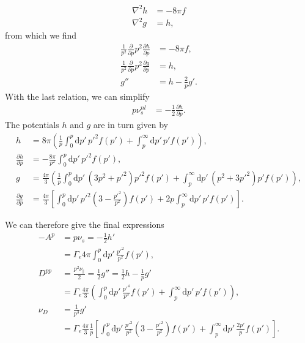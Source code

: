 \documentclass[11pt,a4paper]{article}
\newcommand{\rd}{\ensuremath{\mathrm{d}}}
\begin{document}
\begin{align}
\nabla^2 h &= -8\pi f \nonumber \\
\nabla^2 g &= h,
\end{align}
from which we find
\begin{align}
\frac{1}{p^2}\frac{\partial}{\partial p}p^2\frac{\partial h}{\partial p} &= -8\pi f, \nonumber \\
\frac{1}{p^2}\frac{\partial}{\partial p}p^2\frac{\partial g}{\partial p} &= h , \nonumber \\
g'' &= h-\frac{2}{p}g'.
\end{align}
With the last relation, we can simplify
\begin{align}
p\nu_s^{nl} &=  -\frac{1}{2}\frac{\partial h}{\partial p}. %
\end{align}
The potentials $h$ and $g$ are in turn given by
\begin{align}
h &= 8\pi \left( \frac{1}{p}\int_0^p \rd p' \, p'^2 f(p') + \int_p^\infty \rd p' \, p'f(p')\right), \nonumber \\
\frac{\partial h}{\partial p} &= -\frac{8\pi}{p^2}\int_0^p \rd p' \, p'^2 f(p'), \nonumber \\
g &= \frac{4\pi}{3}\left( \frac{1}{p}\int_0^ p \rd p' \,(3p^2+p'^2)p'^2f(p')  + \int_p^\infty \rd p' \,(p^2+3p'^2)p'f(p')\right), \nonumber \\
\frac{\partial g}{\partial p} &= \frac{4\pi}{3}\left[ \int_0^p \rd p'\,p'^2\left(3-\frac{p'^2}{p^2}\right)f(p') + 2p\int_p^\infty \rd p' \, p' f(p')\right] .
\end{align}

We can therefore give the final expressions
\begin{align}
-A^p &= p\nu_s = -\frac{1}{2}h' \nonumber \\
&= \Gamma_e 4\pi \int_0^p \rd p'\,\frac{p'^2}{p^2}f(p'), \nonumber \\
D^{pp} &= \frac{p^2\nu_\parallel}{2} = \frac{1}{2} g'' = \frac{1}{2}h - \frac{1}{p}g' \nonumber \\
&= \Gamma_e \frac{4\pi}{3}\left( \int_0^p \rd p' \, \frac{p'^4}{p^3} f(p') + \int_p^\infty \rd p' \,p' f(p')\right), \nonumber \\
\nu_D &= \frac{1}{p^3}g' \nonumber \\
&= \Gamma_e  \frac{4\pi}{3}\frac{1}{p}\left[ \int_0^p \rd p'\,\frac{p'^2}{p^2}\left(3-\frac{p'^2}{p^2}\right)f(p') +\int_p^\infty \rd p' \, \frac{2p'}{p} f(p')\right] .
\end{align}
\end{document}
